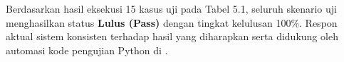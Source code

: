 \documentclass[a4paper,landscape,10pt]{article}
\begin{document}
\vspace{0.2cm}
\begin{tcolorbox}[colback=NavyLight,colframe=NavyPrimary,title=\textbf{Kesimpulan Pengujian}]
Berdasarkan hasil eksekusi 15 kasus uji pada Tabel 5.1, seluruh skenario uji menghasilkan status \textbf{Lulus (Pass)} dengan tingkat kelulusan 100\%. Respon aktual sistem konsisten terhadap hasil yang diharapkan serta didukung oleh automasi kode pengujian Python di .
\end{tcolorbox}
\end{document}

